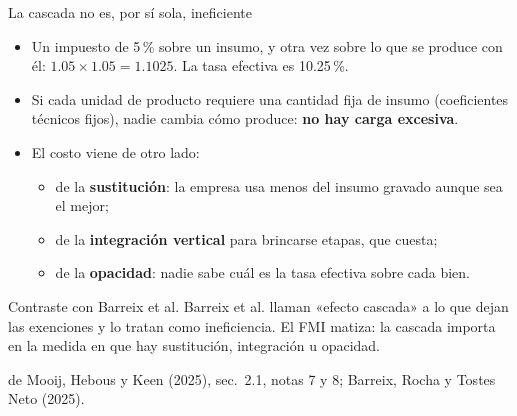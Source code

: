 \documentclass[aspectratio=169,11pt]{beamer}
\newcommand{\fuente}[1]{\par\vfill{\small\color{cGris}#1\par}}
\begin{document}
\begin{frame}{La cascada no es, por sí sola, ineficiente}
  \begin{itemize}
    \item Un impuesto de 5\,\% sobre un insumo, y otra vez sobre lo que se produce con él: $1.05\times1.05 = 1.1025$. La tasa efectiva es 10.25\,\%.
    \pause
    \item Si cada unidad de producto requiere una cantidad fija de insumo (coeficientes técnicos fijos), nadie cambia cómo produce: \textbf{no hay carga excesiva}.
    \pause
    \item El costo viene de otro lado:
      \begin{itemize}
        \item de la \textbf{sustitución}: la empresa usa menos del insumo gravado aunque sea el mejor;
        \item de la \textbf{integración vertical} para brincarse etapas, que cuesta;
        \item de la \textbf{opacidad}: nadie sabe cuál es la tasa efectiva sobre cada bien.
      \end{itemize}
  \end{itemize}
  \pause
  \begin{block}{Contraste con Barreix et al.}
    Barreix et al. llaman «efecto cascada» a lo que dejan las exenciones y lo tratan como ineficiencia. El FMI matiza: la cascada importa en la medida en que hay sustitución, integración u opacidad.
  \end{block}
  \fuente{de Mooij, Hebous y Keen (2025), sec.~2.1, notas 7 y 8; Barreix, Rocha y Tostes Neto (2025).}
\end{frame}
\end{document}
